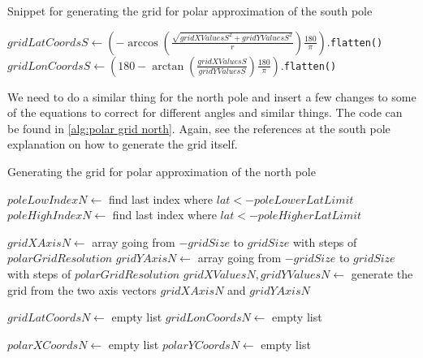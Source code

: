 \begin{algorithm}[htb]
    \caption{Snippet for generating the grid for polar approximation of the south pole}
    \label{alg:polar grid south vectorised}
    $gridLatCoordsS \leftarrow (-\arccos(\frac{\sqrt{gridXValuesS^2 + gridYValuesS^2}}{r})\frac{180}{\pi}).$\texttt{flatten()} \;
    $gridLonCoordsS \leftarrow (180 - \arctan(\frac{gridXValuesS}{gridYValuesS})\frac{180}{\pi}).$\texttt{flatten()} \;
\end{algorithm}

We need to do a similar thing for the north pole and insert a few changes to some of the equations to correct for different angles and similar things. The code can be found in 
\autoref{alg:polar grid north}. Again, see the references at the south pole explanation on how to generate the grid itself.

\begin{algorithm}[htb]
    \caption{Generating the grid for polar approximation of the north pole}
    \label{alg:polar grid north}
    $poleLowIndexN \leftarrow $ find last index where $lat < -poleLowerLatLimit$ \;
    $poleHighIndexN \leftarrow $ find last index where $lat < -poleHigherLatLimit$ \;
    \BlankLine

    $gridXAxisN \leftarrow $ array going from $-gridSize$ to $gridSize$ with steps of $polarGridResolution$ \;
    $gridYAxisN \leftarrow $ array going from $-gridSize$ to $gridSize$ with steps of $polarGridResolution$ \;
    $gridXValuesN, gridYValuesN \leftarrow $ generate the grid from the two axis vectors $gridXAxisN$ and $gridYAxisN$ \;
    \BlankLine 
    
    $gridLatCoordsN \leftarrow $ empty list \;
    $gridLonCoordsN \leftarrow $ empty list \;

    \BlankLine
    $polarXCoordsN \leftarrow$ empty list \;
    $polarYCoordsN \leftarrow$ empty list \;
\end{algorithm}

